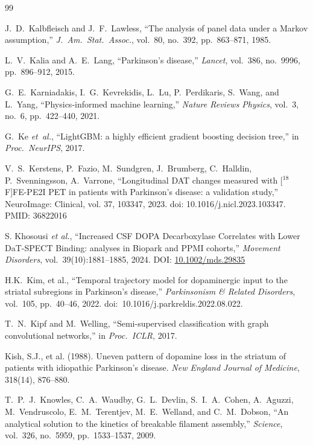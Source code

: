 \begin{thebibliography}{99}

J.~D.~Kalbfleisch and J.~F.~Lawless, ``The analysis of panel data under a Markov assumption,'' \textit{J.\ Am.\ Stat.\ Assoc.}, vol.~80, no.~392, pp.~863--871, 1985.

L.~V.~Kalia and A.~E.~Lang, ``Parkinson's disease,'' \textit{Lancet}, vol.~386, no.~9996, pp.~896--912, 2015.

G.~E.~Karniadakis, I.~G.~Kevrekidis, L.~Lu, P.~Perdikaris, S.~Wang, and L.~Yang, ``Physics-informed machine learning,'' \textit{Nature Reviews Physics}, vol.~3, no.~6, pp.~422--440, 2021.

G.~Ke \textit{et~al.}, ``LightGBM: a highly efficient gradient boosting decision tree,'' in \textit{Proc.\ NeurIPS}, 2017.

 V.~S.~Kerstens, P.~Fazio, M.~Sundgren, J.~Brumberg, C.~Halldin, P.~Svenningsson, A.~Varrone, ``Longitudinal DAT changes measured with [$^{18}$F]FE-PE2I PET in patients with Parkinson's disease: a validation study,'' NeuroImage: Clinical, vol. 37, 103347, 2023. doi: 10.1016/j.nicl.2023.103347. PMID: 36822016

S. Khosousi \textit{et al.},
``Increased CSF DOPA Decarboxylase Correlates with Lower DaT-SPECT Binding: analyses in Biopark and PPMI cohorts,''
\textit{Movement Disorders}, vol.~39(10):1881--1885, 2024. DOI: \href{https://doi.org/10.1002/mds.29835}{10.1002/mds.29835}

H.K.~Kim, et al., ``Temporal trajectory model for dopaminergic input to the striatal subregions in Parkinson's disease,'' \textit{Parkinsonism \& Related Disorders}, vol.~105, pp.~40--46, 2022. doi:~10.1016/j.parkreldis.2022.08.022.

T.~N.~Kipf and M.~Welling, ``Semi-supervised classification with graph convolutional networks,'' in \textit{Proc.\ ICLR}, 2017.

Kish, S.J., et al. (1988).
\newblock Uneven pattern of dopamine loss in the striatum of patients with idiopathic Parkinson's disease.
\newblock \emph{New England Journal of Medicine}, 318(14), 876--880.

T.~P.~J.~Knowles, C.~A.~Waudby, G.~L.~Devlin, S.~I.~A.~Cohen, A.~Aguzzi, M.~Vendruscolo, E.~M.~Terentjev, M.~E.~Welland, and C.~M.~Dobson, ``An analytical solution to the kinetics of breakable filament assembly,'' \textit{Science}, vol.~326, no.~5959, pp.~1533--1537, 2009.


\end{thebibliography}
